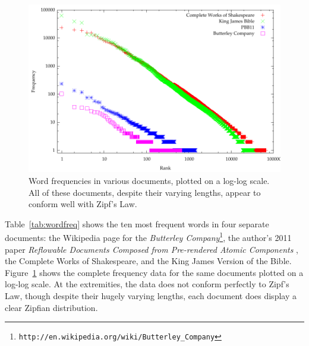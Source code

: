 \begin{figure}
  \begin{center}
  \includegraphics[width=\textwidth]{gnuplot/wordfreq}
  \end{center}
  \caption[Word frequencies in various documents]{Word frequencies in various documents, plotted on a log-log scale. All of these documents, despite their varying lengths, appear to conform well with Zipf's Law.}
  \label{fig:wordfreq}
\end{figure}

Table~\ref{tab:wordfreq} shows the ten most frequent words in four separate documents: the Wikipedia page for the \emph{Butterley Company}\footnote{\texttt{http://en.wikipedia.org/wiki/Butterley\_Company}}, the author's 2011 paper \emph{Reflowable Documents Composed from Pre-rendered Atomic Components} \cite{Pinkney2011}, the Complete Works of Shakespeare, and the King James Version of the Bible. Figure~\ref{fig:wordfreq} shows the complete frequency data for the same documents plotted on a log-log scale. At the extremities, the data does not conform perfectly to Zipf's Law, though despite their hugely varying lengths, each document does display a clear Zipfian distribution.

